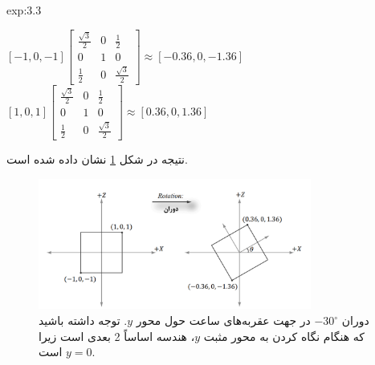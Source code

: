 {\begin{spacing}{1.5}
\begin{example}{exp:3.3}
            \begin{center}
                $[-1,0,-1]\begin{bmatrix}
                              \frac{\displaystyle \sqrt{\displaystyle 3}}{\displaystyle 2} & 0 & \frac{\displaystyle 1}{\displaystyle 2}                      \\
                              0                                                            & 1 & 0                                                            \\
                              \frac{\displaystyle 1}{\displaystyle 2}                      & 0 & \frac{\displaystyle \sqrt{\displaystyle 3}}{\displaystyle 2}
                \end{bmatrix}\approx[-0.36,0,-1.36]$\\
                $[1,0,1]\begin{bmatrix}
                            \frac{\displaystyle \sqrt{\displaystyle 3}}{\displaystyle 2} & 0 & \frac{\displaystyle 1}{\displaystyle 2}                      \\
                            0                                                            & 1 & 0                                                            \\
                            \frac{\displaystyle 1}{\displaystyle 2}                      & 0 & \frac{\displaystyle \sqrt{\displaystyle 3}}{\displaystyle 2}
                \end{bmatrix}\approx[0.36,0,1.36]$
            \end{center}

            نتیجه در شکل \ref{fig:4.Session.1.3.4} نشان داده شده است.

            \begin{figure}[H]
                \centering
                \setlength{\belowcaptionskip}{-10pt}
                \includegraphics[width=0.8\textwidth]{Images/4/3/4.Session.1.3.4}
                \caption {دوران $-30^\circ$ در جهت عقربه‌های ساعت حول محور $y$.
                توجه داشته باشید که هنگام نگاه کردن به محور مثبت $y$، هندسه اساساً 2 بعدی است زیرا $y=0$ است. \textbf{\vspace{20pt}}}
                \label{fig:4.Session.1.3.4}
            \end{figure}
        \end{example}
    \end{spacing}
}


